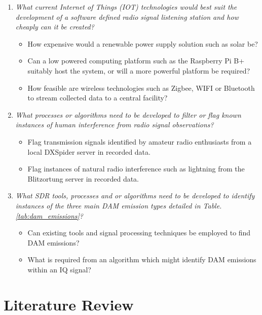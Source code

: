 \documentclass[runningheads,a4paper]{llncs}
\begin{document}
\begin{enumerate}
  \item \textit{What current Internet of Things (\gls{IOT}) technologies would best suit the development of a software defined radio signal listening station and how cheaply can it be created?}
  \begin{itemize}
  	\item How expensive would a renewable power supply solution such as solar be?
  	\item Can a low powered computing platform such as the Raspberry Pi B+ suitably host the system, or will a more powerful platform be required?
  	\item How feasible are wireless technologies such as Zigbee, WIFI or Bluetooth to stream collected data to a central facility?
  \end{itemize}
  
  \item \textit{What processes or algorithms need to be developed to filter or flag known instances of human interference from radio signal observations?}
  \begin{itemize}
  	\item Flag transmission signals identified by amateur radio enthusiasts from a local DXSpider server in recorded data.
  	\item Flag instances of natural radio interference such as lightning from the Blitzortung server in recorded data.
  \end{itemize}
  
  \item \textit{What \gls{SDR} tools, processes and or algorithms need to be developed to identify instances of the three main \gls{DAM} emission types detailed in Table. \ref{tab:dam_emissions}?}
  \begin{itemize}
  	\item Can existing tools and signal processing techniques be employed to find \gls{DAM} emissions?
  	\item What is required from an algorithm which might identify \gls{DAM} emissions within an \gls{IQ} signal?
  \end{itemize}
  
\end{enumerate}

%
%
\newpage
\section*{Literature Review}
\end{document}
